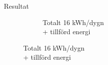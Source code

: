 \begin{frame}{Resultat}
\begin{figure}
{\begin{subfigure}[b]{0.55\textwidth}
                \caption*{Totalt 16 kWh/dygn \\+ tillförd energi}
        \end{subfigure}
        }
\end{figure}

\end{frame}
